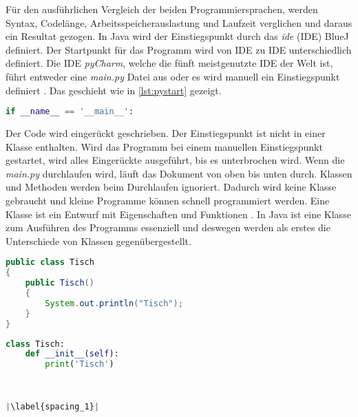 Für den ausführlichen Vergleich der beiden Programmiersprachen, werden Syntax, Codelänge, Arbeitsspeicherauslastung und Laufzeit verglichen und daraus ein Resultat gezogen.
In Java wird der Einstiegspunkt durch das \textit{\acrlong{ide}} (IDE) BlueJ definiert. Der Startpunkt für das Programm wird von IDE zu IDE unterschiedlich definiert. Die IDE \textit{pyCharm}, welche die fünft meistgenutzte IDE der Welt ist, führt entweder eine \textit{main.py} Datei aus oder es wird manuell ein Einstiegspunkt definiert \cite{Github:IDE}\cite{PyCharm}. Das geschieht wie in \ref{lst:pystart} gezeigt.

\begin{lstlisting}[language=python,caption={Einstiegspunkt Python},captionpos=b,label={lst:pystart},frame=none]
if __name__ == '__main__':
\end{lstlisting}

Der Code wird eingerückt geschrieben. Der Einstiegspunkt ist nicht in einer Klasse enthalten. Wird das Programm bei einem manuellen Einstiegspunkt gestartet, wird alles Eingerückte ausgeführt, bis es unterbrochen wird. Wenn die \textit{main.py} durchlaufen wird, läuft das Dokument von oben bis unten durch. Klassen und Methoden werden beim Durchlaufen ignoriert. Dadurch wird keine Klasse gebraucht und kleine Programme können schnell programmiert werden. Eine Klasse ist ein Entwurf mit Eigenschaften und Funktionen \cite{gfg}. In Java ist eine Klasse zum Ausführen des Programms essenziell und deswegen werden als erstes die Unterschiede von Klassen gegenübergestellt.

\begin{minipage}{.5\linewidth}
\begin{lstlisting}[language=java,caption={Klasse in Java},captionpos=b,label={lst:java:class},frame=none]
public class Tisch
{
    public Tisch()
    {
        System.out.println("Tisch");
    }
}
\end{lstlisting}
\end{minipage}
\begin{minipage}{.5\linewidth}
\begin{lstlisting}[language=python,caption={Klasse in Python},captionpos=b,label={lst:python:class},frame=l,escapechar=|]
class Tisch:
    def __init__(self):
        print('Tisch')
        
        

|\label{spacing_1}|
\end{lstlisting}
\end{minipage}


